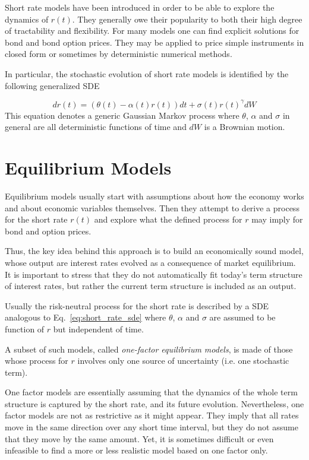 Short rate models have been introduced in order to be able to explore the dynamics of $r(t)$. They generally owe their popularity to both their high degree of tractability and flexibility. For many models one can find explicit solutions for bond and bond option prices. They may be applied to price simple instruments in closed form or sometimes by deterministic numerical methods.

In particular, the stochastic evolution of short rate models is identified by the following generalized SDE

\begin{equation}
dr(t) = (\theta(t)-\alpha(t)r(t)) dt + \sigma(t)r(t)^{\gamma} dW
\label{eq:short_rate_sde}
\end{equation}
This equation denotes a generic Gaussian Markov process where $\theta$, $\alpha$ and $\sigma$ in general are all deterministic functions of time and $dW$ is a Brownian motion.

\section{Equilibrium Models}\label{equilibrium-models}

Equilibrium models usually start with assumptions about how the economy works and about economic variables themselves. Then they attempt to derive a process for the short rate $r(t)$ and explore what the defined process for $r$ may imply for bond and option prices.

Thus, the key idea behind this approach is to build an economically sound model, whose output are interest rates evolved as a consequence of market equilibrium. It is important to stress that they do not automatically fit today’s term structure of interest rates, but rather the current term structure is included as an output. 

Usually the risk-neutral process for the short rate is described by a SDE analogous to Eq.~\ref{eq:short_rate_sde} where $\theta$, $\alpha$ and $\sigma$ are assumed to be function of $r$ but independent of time.

A subset of such models, called \emph{one-factor equilibrium models}, is made of those whose process for $r$ involves only one source of uncertainty (i.e. one stochastic term). 

One factor models are essentially assuming that the dynamics of the whole term structure is captured by the short rate, and its future evolution. Nevertheless, one factor models are not as restrictive as it might appear. They imply that all rates move in the same direction over any short time interval, but they do not assume that they move by the same amount. Yet, it is sometimes difficult or even infeasible to find a more or less realistic model based on one factor only.

